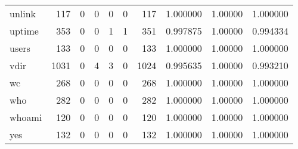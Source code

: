 \begin{tabular}{lrrrrrrrrr}
unlink    &                    117 &                                  0 &                                 0 &                                0 &                                 0 &                             117 &                                1.000000 &                                1.00000 &                             1.000000 \\
uptime    &                    353 &                                  0 &                                 0 &                                1 &                                 1 &                             351 &                                0.997875 &                                1.00000 &                             0.994334 \\
users     &                    133 &                                  0 &                                 0 &                                0 &                                 0 &                             133 &                                1.000000 &                                1.00000 &                             1.000000 \\
vdir      &                   1031 &                                  0 &                                 4 &                                3 &                                 0 &                            1024 &                                0.995635 &                                1.00000 &                             0.993210 \\
wc        &                    268 &                                  0 &                                 0 &                                0 &                                 0 &                             268 &                                1.000000 &                                1.00000 &                             1.000000 \\
who       &                    282 &                                  0 &                                 0 &                                0 &                                 0 &                             282 &                                1.000000 &                                1.00000 &                             1.000000 \\
whoami    &                    120 &                                  0 &                                 0 &                                0 &                                 0 &                             120 &                                1.000000 &                                1.00000 &                             1.000000 \\
yes       &                    132 &                                  0 &                                 0 &                                0 &                                 0 &                             132 &                                1.000000 &                                1.00000 &                             1.000000 \\
\bottomrule
\end{tabular}
